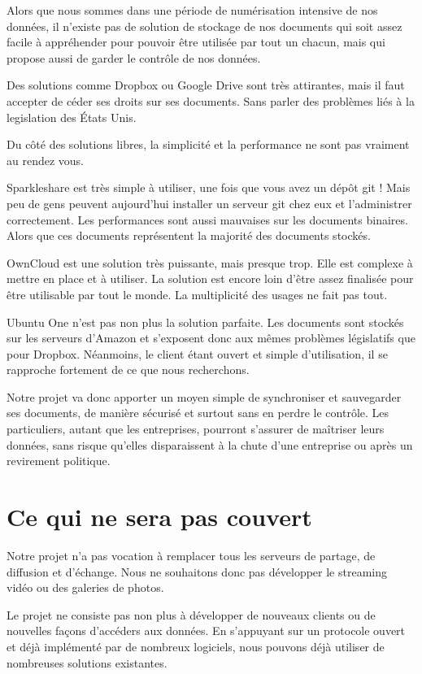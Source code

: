 \documentclass[12pt]{report}
\begin{document}
Alors que nous sommes dans une période de numérisation intensive de nos données, il n'existe pas de solution de stockage de nos documents qui soit assez facile à appréhender pour pouvoir être utilisée par tout un chacun, mais qui propose aussi de garder le contrôle de nos données.

Des solutions comme Dropbox ou Google Drive sont très attirantes, mais il faut accepter de céder ses droits sur ses documents. Sans parler des problèmes liés à la legislation des États Unis.

Du côté des solutions libres, la simplicité et la performance ne sont pas vraiment au rendez vous.

Sparkleshare est très simple à utiliser, une fois que vous avez un dépôt git ! Mais peu de gens peuvent aujourd'hui installer un serveur git chez eux et l'administrer correctement. Les performances sont aussi mauvaises sur les documents binaires. Alors que ces documents représentent la majorité des documents stockés.

OwnCloud est une solution très puissante, mais presque trop. Elle est complexe à mettre en place et à utiliser. La solution est encore loin d'être assez finalisée pour être utilisable par tout le monde. La multiplicité des usages ne fait pas tout.

Ubuntu One n'est pas non plus la solution parfaite. Les documents sont stockés sur les serveurs d'Amazon et s'exposent donc aux mêmes problèmes législatifs que pour Dropbox. Néanmoins, le client étant ouvert et simple d'utilisation, il se rapproche fortement de ce que nous recherchons.

Notre projet va donc apporter un moyen simple de synchroniser et sauvegarder ses documents, de manière sécurisé et surtout sans en perdre le contrôle. Les particuliers, autant que les entreprises, pourront s'assurer de maîtriser leurs données, sans risque qu'elles disparaissent à la chute d'une entreprise ou après un revirement politique.

\section{Ce qui ne sera pas couvert}

Notre projet n'a pas vocation à remplacer tous les serveurs de partage, de diffusion et d'échange. Nous ne souhaitons donc pas développer le streaming vidéo ou des galeries de photos.

Le projet ne consiste pas non plus à développer de nouveaux clients ou de nouvelles façons d'accéders aux données. En s'appuyant sur un protocole ouvert et déjà implémenté par de nombreux logiciels, nous pouvons déjà utiliser de nombreuses solutions existantes.
\end{document}
